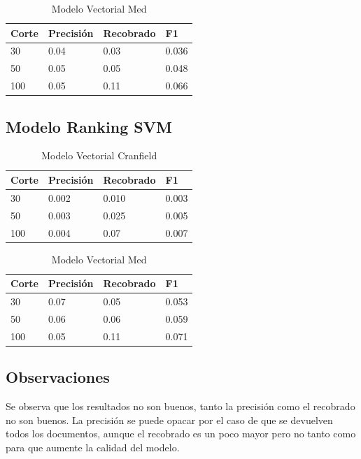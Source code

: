 \documentclass[runningheads]{llncs}
\begin{document}
\begin{table}
	\caption{Modelo Vectorial Med}\label{med_vec_result}
 \begin{tabular}{|l|l|l|l|}
 \hline
 	Corte &  Precisión & Recobrado & F1\\
 \hline
	30 & 0.04 & 0.03 & 0.036\\
	50 & 0.05 & 0.05 & 0.048\\
	100 & 0.05 & 0.11 & 0.066\\
 \hline
 \end{tabular}
\end{table}

\subsection{Modelo Ranking SVM}


\begin{table}
	\caption{Modelo Vectorial Cranfield}\label{cran_svm_result}
 \begin{tabular}{|l|l|l|l|}
 \hline
 	Corte &  Precisión & Recobrado & F1\\
 \hline
	30 & 0.002 & 0.010 & 0.003\\
	50 & 0.003 & 0.025 & 0.005\\
	100 & 0.004 & 0.07 & 0.007\\
 \hline
 \end{tabular}
\end{table}


\begin{table}
	\caption{Modelo Vectorial Med}\label{med_svm_result}
 \begin{tabular}{|l|l|l|l|}
 \hline
 	Corte &  Precisión & Recobrado & F1\\
 \hline
	30 & 0.07 & 0.05 & 0.053\\
	50 & 0.06 & 0.06 & 0.059\\
	100 & 0.05 & 0.11 & 0.071\\
 \hline
 \end{tabular}
\end{table}

\subsection{Observaciones}

Se observa que los resultados no son buenos, tanto la precisión como el recobrado no son buenos. La precisión
se puede opacar por el caso de que se devuelven todos los documentos, aunque el recobrado es un poco mayor pero
no tanto como para que aumente la calidad del modelo.
\end{document}
